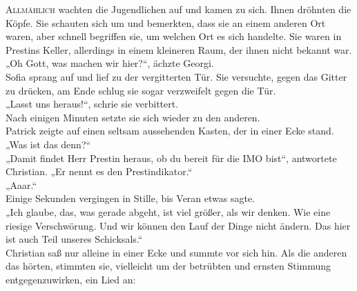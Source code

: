 \documentclass[oneside]{memoir}
\begin{document}
\lettrine{A}{llmählich} wachten die Jugendlichen auf und kamen zu sich. Ihnen dröhnten die Köpfe. Sie schauten sich um und bemerkten, dass sie an einem anderen Ort waren, aber schnell begriffen sie, um welchen Ort es sich handelte. Sie waren in Prestins Keller, allerdings in einem kleineren Raum, der ihnen nicht bekannt war. \\
„Oh Gott, was machen wir hier?“, ächzte Georgi. \\
Sofia sprang auf und lief zu der vergitterten Tür. Sie versuchte, gegen das Gitter zu drücken, am Ende schlug sie sogar verzweifelt gegen die Tür. \\
„Lasst uns heraus!“, schrie sie verbittert. \\
Nach einigen Minuten setzte sie sich wieder zu den anderen. \\
Patrick zeigte auf einen seltsam aussehenden Kasten, der in einer Ecke stand. \\
„Was ist das denn?“ \\
„Damit findet Herr Prestin heraus, ob du bereit für die IMO bist“, antwortete Christian. „Er nennt es den Prestindikator.“ \\
„Aaar.“ \\
Einige Sekunden vergingen in Stille, bis Veran etwas sagte. \\
„Ich glaube, das, was gerade abgeht, ist viel größer, als wir denken. Wie eine riesige Verschwörung. Und wir können den Lauf der Dinge nicht ändern. Das hier ist auch Teil unseres Schicksals.“ \\
Christian saß nur alleine in einer Ecke und summte vor sich hin. Als die anderen das hörten, stimmten sie, vielleicht um der betrübten und ernsten Stimmung entgegenzuwirken, ein Lied an: \\
\end{document}
